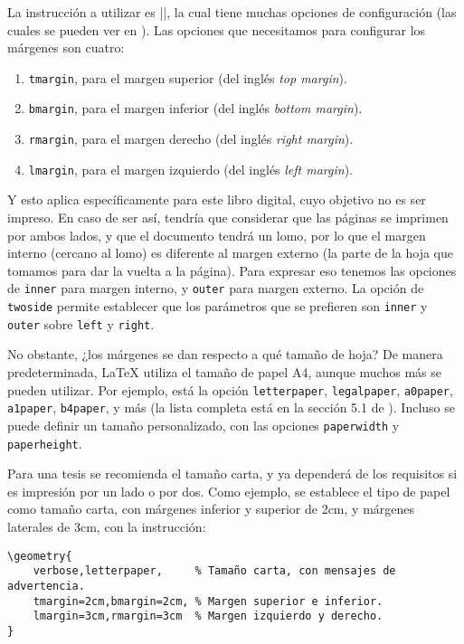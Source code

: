 La instrucción a utilizar es |\geometry|, la cual tiene muchas opciones de configuración (las cuales se pueden ver en \cite{bib:geometry_package}). Las opciones que necesitamos para configurar los márgenes son cuatro:
\begin{enumerate}
	\item \texttt{tmargin}, para el margen superior (del inglés \emph{top margin}).
	\item \texttt{bmargin}, para el margen inferior (del inglés \emph{bottom margin}).
	\item \texttt{rmargin}, para el margen derecho (del inglés \emph{right margin}).
	\item \texttt{lmargin}, para el margen izquierdo (del inglés \emph{left margin}).
\end{enumerate}

Y esto aplica específicamente para este libro digital, cuyo objetivo no es ser impreso. En caso de ser así, tendría que considerar que las páginas se imprimen por ambos lados, y que el documento tendrá un lomo, por lo que el margen interno (cercano al lomo) es diferente al margen externo (la parte de la hoja que tomamos para dar la vuelta a la página). Para expresar eso tenemos las opciones de \texttt{inner} para margen interno, y \texttt{outer} para margen externo. La opción de \texttt{twoside} permite establecer que los parámetros que se prefieren son \texttt{inner} y \texttt{outer} sobre \texttt{left} y \texttt{right}.

No obstante, ¿los márgenes se dan respecto a qué tamaño de hoja? De manera predeterminada, \LaTeX{} utiliza el tamaño de papel A4, aunque muchos más se pueden utilizar. Por ejemplo, está la opción \texttt{letterpaper}, \texttt{legalpaper}, \texttt{a0paper}, \texttt{a1paper}, \texttt{b4paper}, y más (la lista completa está en la sección 5.1 de \cite{bib:geometry_package}). Incluso se puede definir un tamaño personalizado, con las opciones \texttt{paperwidth} y \texttt{paperheight}.

Para una tesis se recomienda el tamaño carta, y ya dependerá de los requisitos si es impresión por un lado o por dos. Como ejemplo, se establece el tipo de papel como tamaño carta, con márgenes inferior y superior de 2cm, y márgenes laterales de 3cm, con la instrucción:

\begin{lstlisting}[style=latex]
\geometry{
	verbose,letterpaper,     % Tamaño carta, con mensajes de advertencia.
	tmargin=2cm,bmargin=2cm, % Margen superior e inferior.
	lmargin=3cm,rmargin=3cm  % Margen izquierdo y derecho.
}
\end{lstlisting}

